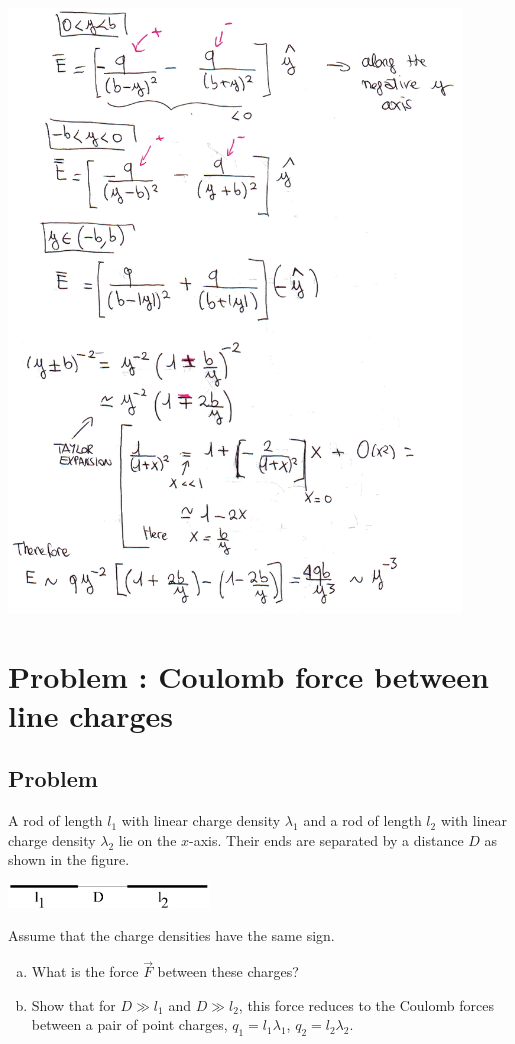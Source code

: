 \documentclass[solutions]{esg8022pset}
\begin{document}
  \begin{center}\includegraphics[width=0.9\textwidth]{ps01_sol_07_2}\end{center}
\section{Problem \thesection: Coulomb force between line charges}
\subsection{Problem}
  A rod of length $l_1$ with linear charge density $\lambda_1$ and a rod of length $l_2$ with linear charge density $\lambda_2$ lie on the $x$-axis.  Their ends are separated by a distance $D$ as shown in the figure.
  \begin{center}\includegraphics[width=0.4\textwidth]{ps01_9}\end{center}
  Assume that the charge densities have the same sign.
  \begin{enumerate}[(a)]
    \item What is the force $\vec F$ between these charges?
    \item Show that for $D \gg l_1$ and $D \gg l_2$, this force reduces to the Coulomb forces between a pair of point charges, $q_1 = l_1\lambda_1$, $q_2 = l_2\lambda_2$.
  \end{enumerate}
\end{document}
